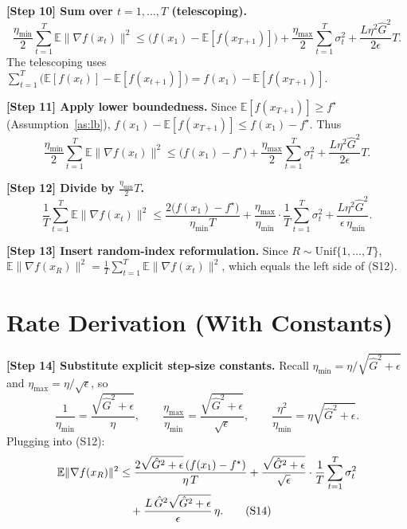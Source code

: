 \documentclass[11pt]{article}
\begin{document}
\noindent\textbf{[Step 10] Sum over $t=1,\dots,T$ (telescoping).}
\[
\frac{\eta_{\min}}{2}\sum_{t=1}^T \mathbb{E}\|\nabla f(x_t)\|^2
\le \big(f(x_1)-\mathbb{E}[f(x_{T+1})]\big)
+ \frac{\eta_{\max}}{2}\sum_{t=1}^T \sigma_t^2
+ \frac{L\eta^2 \hat G^2}{2\epsilon}T.
\tag{S10}
\]
The telescoping uses
$\sum_{t=1}^T \big(\mathbb{E}[f(x_t)]-\mathbb{E}[f(x_{t+1})]\big)
= f(x_1)-\mathbb{E}[f(x_{T+1})]$.

\noindent\textbf{[Step 11] Apply lower boundedness.}
Since $\mathbb{E}[f(x_{T+1})] \ge f^\star$ (Assumption~\ref{as:lb}),
$f(x_1)-\mathbb{E}[f(x_{T+1})] \le f(x_1)-f^\star$. Thus
\[
\frac{\eta_{\min}}{2}\sum_{t=1}^T \mathbb{E}\|\nabla f(x_t)\|^2
\le \big(f(x_1)-f^\star\big)
+ \frac{\eta_{\max}}{2}\sum_{t=1}^T \sigma_t^2
+ \frac{L\eta^2 \hat G^2}{2\epsilon}T.
\tag{S11}
\]

\noindent\textbf{[Step 12] Divide by $\tfrac{\eta_{\min}}{2}T$.}
\[
\frac{1}{T}\sum_{t=1}^T \mathbb{E}\|\nabla f(x_t)\|^2
\le \frac{2\big(f(x_1)-f^\star\big)}{\eta_{\min} T}
+ \frac{\eta_{\max}}{\eta_{\min}}\cdot\frac{1}{T}\sum_{t=1}^T \sigma_t^2
+ \frac{L\eta^2 \hat G^2}{\epsilon\,\eta_{\min}}.
\tag{S12}
\]

\noindent\textbf{[Step 13] Insert random-index reformulation.}
Since $R\sim \mathrm{Unif}\{1,\dots,T\}$,
$\mathbb{E}\|\nabla f(x_R)\|^2 = \frac{1}{T}\sum_{t=1}^T \mathbb{E}\|\nabla f(x_t)\|^2$,
which equals the left side of (S12).

\section*{Rate Derivation (With Constants)}

\noindent\textbf{[Step 14] Substitute explicit step-size constants.}
Recall $\eta_{\min} = \eta/\sqrt{\hat G^2+\epsilon}$ and $\eta_{\max}=\eta/\sqrt{\epsilon}$, so
\[
\frac{1}{\eta_{\min}} = \frac{\sqrt{\hat G^2+\epsilon}}{\eta},
\qquad
\frac{\eta_{\max}}{\eta_{\min}} = \frac{\sqrt{\hat G^2+\epsilon}}{\sqrt{\epsilon}},
\qquad
\frac{\eta^2}{\eta_{\min}} = \eta\sqrt{\hat G^2+\epsilon}.
\]
Plugging into (S12):
\begin{align}
\mathbb{E}\|\nabla f(x_R)\|^2
&\le \frac{2\sqrt{\hat G^2+\epsilon}\,(f(x_1)-f^\star)}{\eta\,T}
+ \frac{\sqrt{\hat G^2+\epsilon}}{\sqrt{\epsilon}}\cdot\frac{1}{T}\sum_{t=1}^T\sigma_t^2
\notag\\
&\quad + \frac{L\,\hat G^2 \sqrt{\hat G^2+\epsilon}}{\epsilon}\,\eta.
\tag{S14}
\end{align}
\end{document}
